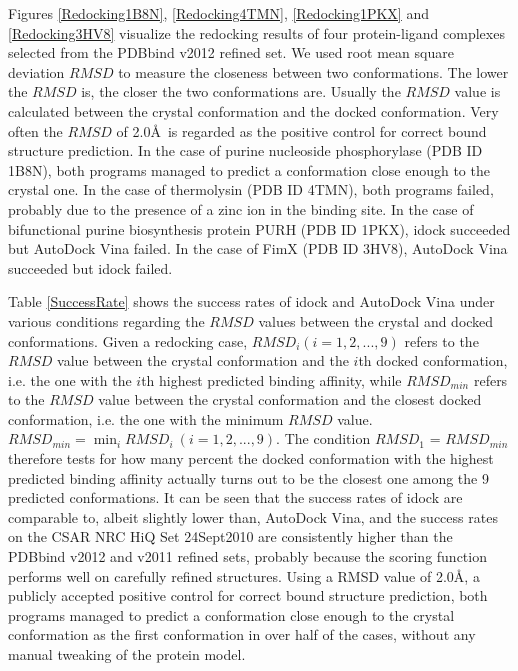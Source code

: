 \documentclass[10pt]{article}
\begin{document}
Figures \ref{Redocking1B8N}, \ref{Redocking4TMN}, \ref{Redocking1PKX} and \ref{Redocking3HV8} visualize the redocking results of four protein-ligand complexes selected from the PDBbind v2012 refined set. We used root mean square deviation $RMSD$ to measure the closeness between two conformations. The lower the $RMSD$ is, the closer the two conformations are. Usually the $RMSD$ value is calculated between the crystal conformation and the docked conformation. Very often the $RMSD$ of 2.0\AA\ is regarded as the positive control for correct bound structure prediction. In the case of purine nucleoside phosphorylase (PDB ID 1B8N), both programs managed to predict a conformation close enough to the crystal one. In the case of thermolysin (PDB ID 4TMN), both programs failed, probably due to the presence of a zinc ion in the binding site. In the case of bifunctional purine biosynthesis protein PURH (PDB ID 1PKX), idock succeeded but AutoDock Vina failed. In the case of FimX (PDB ID 3HV8), AutoDock Vina succeeded but idock failed.

Table \ref{SuccessRate} shows the success rates of idock and AutoDock Vina under various conditions regarding the $RMSD$ values between the crystal and docked conformations. Given a redocking case, $RMSD_i (i = 1,2,...,9)$ refers to the $RMSD$ value between the crystal conformation and the $i$th docked conformation, i.e. the one with the $i$th highest predicted binding affinity, while $RMSD_{min}$ refers to the $RMSD$ value between the crystal conformation and the closest docked conformation, i.e. the one with the minimum $RMSD$ value. $RMSD_{min} = \displaystyle\min_{i}RMSD_i\ (i = 1,2,...,9)$. The condition $RMSD_1$ = $RMSD_{min}$ therefore tests for how many percent the docked conformation with the highest predicted binding affinity actually turns out to be the closest one among the 9 predicted conformations. It can be seen that the success rates of idock are comparable to, albeit slightly lower than, AutoDock Vina, and the success rates on the CSAR NRC HiQ Set 24Sept2010 are consistently higher than the PDBbind v2012 and v2011 refined sets, probably because the scoring function performs well on carefully refined structures. Using a RMSD value of 2.0\AA, a publicly accepted positive control for correct bound structure prediction, both programs managed to predict a conformation close enough to the crystal conformation as the first conformation in over half of the cases, without any manual tweaking of the protein model.
\end{document}
